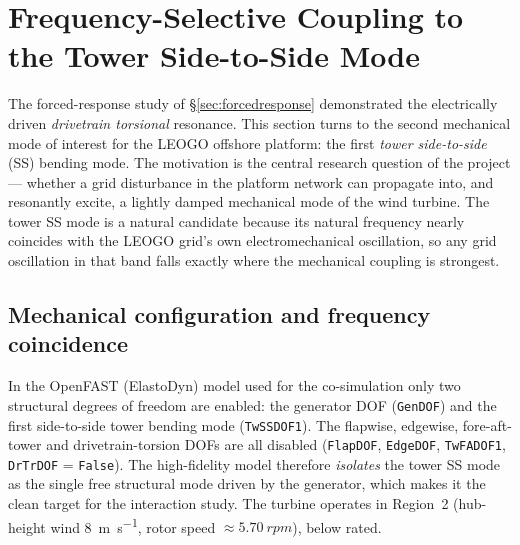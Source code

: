 
\section{Frequency-Selective Coupling to the Tower Side-to-Side Mode}
\label{sec:tower-ss-resonance}

The forced-response study of \S\ref{sec:forcedresponse} demonstrated the
electrically driven \emph{drivetrain torsional} resonance. This section turns to
the second mechanical mode of interest for the LEOGO offshore platform: the
first \emph{tower side-to-side} (SS) bending mode. The motivation is the central
research question of the project --- whether a grid disturbance in the platform
network can propagate into, and resonantly excite, a lightly damped mechanical
mode of the wind turbine. The tower SS mode is a natural candidate because its
natural frequency nearly coincides with the LEOGO grid's own electromechanical
oscillation, so any grid oscillation in that band falls exactly where the
mechanical coupling is strongest.

\subsection{Mechanical configuration and frequency coincidence}
\label{subsec:ss-config}

In the OpenFAST (ElastoDyn) model used for the co-simulation only two structural
degrees of freedom are enabled: the generator DOF (\texttt{GenDOF}) and the
first side-to-side tower bending mode (\texttt{TwSSDOF1}). The flapwise,
edgewise, fore-aft-tower and drivetrain-torsion DOFs are all disabled
(\texttt{FlapDOF}, \texttt{EdgeDOF}, \texttt{TwFADOF1}, \texttt{DrTrDOF} =
\texttt{False}). The high-fidelity model therefore \emph{isolates} the tower SS
mode as the single free structural mode driven by the generator, which makes it
the clean target for the interaction study. The turbine operates in Region~2
(hub-height wind \SI{8}{\metre\per\second}, rotor speed
\(\approx\SI{5.70}{rpm}\)), below rated.

